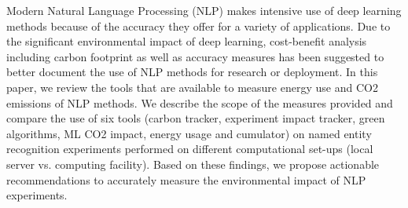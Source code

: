Modern Natural Language Processing (NLP) makes intensive use of deep learning methods because of the accuracy they offer for a variety of applications. Due to the significant environmental impact of deep learning, cost-benefit analysis including carbon footprint as well as accuracy measures has been suggested to better document the use of NLP methods for research or deployment. In this paper, we review the tools that are available to measure energy use and CO2 emissions of NLP methods. We describe the scope of the measures provided and compare the use of six tools (carbon tracker, experiment impact tracker, green algorithms, ML CO2 impact, energy usage and cumulator) on named entity recognition experiments performed on different computational set-ups (local server vs. computing facility). Based on these findings, we propose actionable recommendations to accurately measure the environmental impact of NLP experiments.
